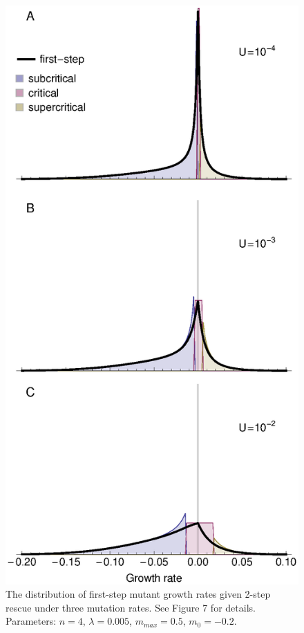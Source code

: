 \documentclass[9pt,twocolumn,twoside]{../main/gsajnl}
\begin{document}
\begin{figure}[htbp]
\centering
\includegraphics[width=\linewidth]{FigureS2.eps}
\caption{
The distribution of first-step mutant growth rates given 2-step rescue under three mutation rates. 
See Figure 7 for details.
Parameters: $n=4$, $\lambda=0.005$, $m_{max}=0.5$, $m_0=-0.2$.
}%
\label{fig:firststepDFE_mutation}
\end{figure}
\end{document}
